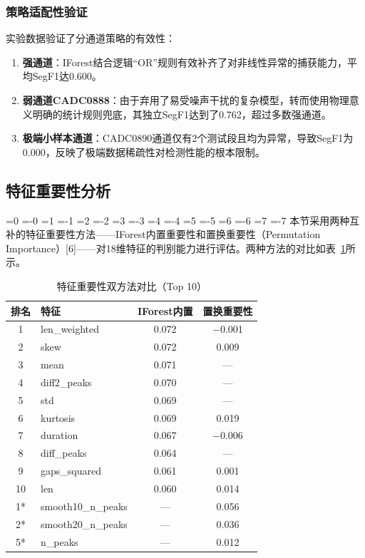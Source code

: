 \documentclass[12pt, a4paper]{article}
\newcommand{\zihao}[1]{%
    \ifnum#1=0 {\fontsize{42pt}{50pt}\selectfont}%
    \else\ifnum#1=-0 {\fontsize{36pt}{44pt}\selectfont}%
    \else\ifnum#1=1 {\fontsize{26pt}{32pt}\selectfont}%
    \else\ifnum#1=-1 {\fontsize{24pt}{28pt}\selectfont}%
    \else\ifnum#1=2 {\fontsize{22pt}{26pt}\selectfont}%
    \else\ifnum#1=-2 {\fontsize{18pt}{22pt}\selectfont}%
    \else\ifnum#1=3 {\fontsize{16pt}{20pt}\selectfont}%
    \else\ifnum#1=-3 {\fontsize{15pt}{18pt}\selectfont}%
    \else\ifnum#1=4 {\fontsize{14pt}{17pt}\selectfont}%
    \else\ifnum#1=-4 {\fontsize{12pt}{15pt}\selectfont}%
    \else\ifnum#1=5 {\fontsize{10.5pt}{13pt}\selectfont}%
    \else\ifnum#1=-5 {\fontsize{9pt}{11pt}\selectfont}%
    \else\ifnum#1=6 {\fontsize{7.5pt}{9pt}\selectfont}%
    \else\ifnum#1=-6 {\fontsize{6.5pt}{8pt}\selectfont}%
    \else\ifnum#1=7 {\fontsize{5.5pt}{7pt}\selectfont}%
    \else\ifnum#1=-7 {\fontsize{5pt}{6pt}\selectfont}%
    \fi\fi\fi\fi\fi\fi\fi\fi\fi\fi\fi\fi\fi\fi\fi\fi
}
\newcommand{\songti}{\CJKfontspec{SimSun}}
\begin{document}
\subsubsection{策略适配性验证}

实验数据验证了分通道策略的有效性：

\begin{enumerate}[label=(\arabic*)]
    \item \textbf{强通道}：IForest结合逻辑``OR''规则有效补齐了对非线性异常的捕获能力，平均SegF1达0.600。
    \item \textbf{弱通道CADC0888}：由于弃用了易受噪声干扰的复杂模型，转而使用物理意义明确的统计规则兜底，其独立SegF1达到了0.762，超过多数强通道。
    \item \textbf{极端小样本通道}：CADC0890通道仅有2个测试段且均为异常，导致SegF1为0.000，反映了极端数据稀疏性对检测性能的根本限制。
\end{enumerate}

\subsection{特征重要性分析}

\zihao{5}\songti
本节采用两种互补的特征重要性方法——IForest内置重要性和置换重要性（Permutation Importance）[6]——对18维特征的判别能力进行评估。两种方法的对比如表~\ref{tab:feature_importance}所示。

\begin{table}[H]
\centering
\caption{特征重要性双方法对比（Top 10）}
\label{tab:feature_importance}
\begin{tabular}{clcc}
\toprule
排名 & 特征 & IForest内置 & 置换重要性 \\
\midrule
1 & len\_weighted & 0.072 & $-$0.001 \\
2 & skew & 0.072 & 0.009 \\
3 & mean & 0.071 & --- \\
4 & diff2\_peaks & 0.070 & --- \\
5 & std & 0.069 & --- \\
6 & kurtosis & 0.069 & 0.019 \\
7 & duration & 0.067 & $-$0.006 \\
8 & diff\_peaks & 0.064 & --- \\
9 & gaps\_squared & 0.061 & 0.001 \\
10 & len & 0.060 & 0.014 \\
\midrule
1* & smooth10\_n\_peaks & --- & 0.056 \\
2* & smooth20\_n\_peaks & --- & 0.036 \\
5* & n\_peaks & --- & 0.012 \\
\bottomrule
\end{tabular}
\end{table}
\end{document}
